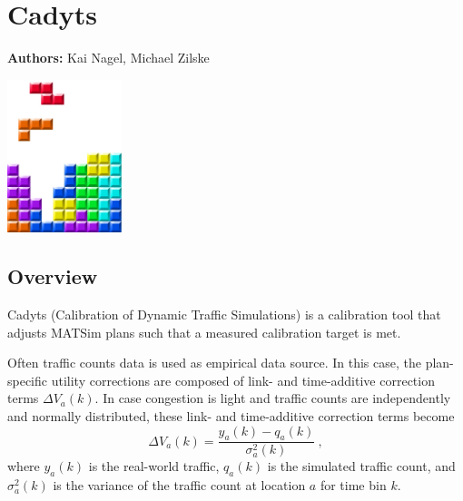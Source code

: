 \chapter{Cadyts}
\label{ch:cadyts}

\hfill \textbf{Authors:} Kai Nagel, Michael Zilske

\begin{center} \includegraphics[width=0.25\textwidth, angle=0]{frontmatter/figures/MATSimBook.jpg} \end{center}


\section{Overview}

Cadyts (Calibration of Dynamic Traffic Simulations) is a calibration tool that adjusts MATSim plans such that a measured calibration target is met. 

Often traffic counts data is used as empirical data source.  In this case, the plan-specific utility corrections are composed of link- and time-additive correction terms $\Delta V_a(k)$.  In case congestion is light and traffic counts are independently and normally distributed, these link- and time-additive correction terms become \cite[p.487]{FloetteroedChenEtAl2011BehavioralCalibAndAnaNETS}
\begin{equation}
\Delta V_a(k) = \frac{y_a(k) - q_a(k)} {\sigma_a^2(k)} \ ,
\label{eq:cadyts:correction}
\end{equation}
%
where $y_a(k)$ is the real-world traffic, $q_a(k)$ is the simulated traffic count, and $\sigma^2_a(k)$ is the variance of the traffic count at location $a$ for time bin $k$.
%

